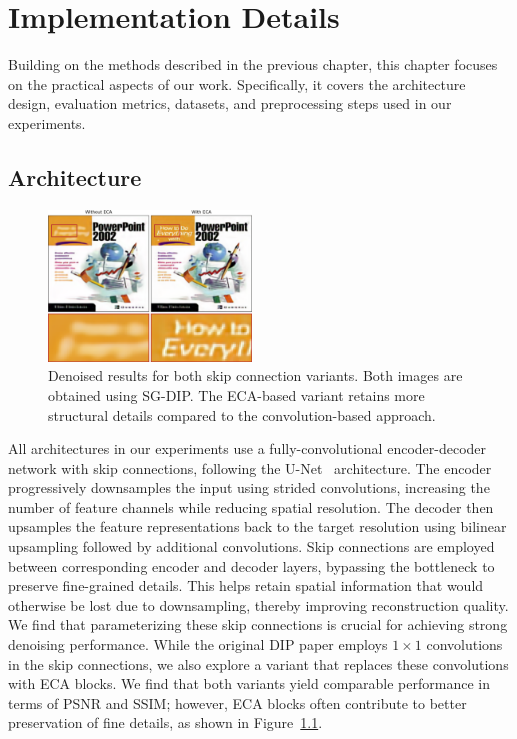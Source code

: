 \chapter{Implementation Details}

Building on the methods described in the previous chapter, this chapter focuses on the practical aspects of our work.
Specifically, it covers the architecture design, evaluation metrics, datasets, and preprocessing steps used in our experiments.

\section{Architecture}\label{sec:architecture}

\begin{figure}
    \vspace{-12pt}
    \centering
    \includegraphics[width=0.48\textwidth]{img/fig_5.1.png}
    \caption{
        Denoised results for both skip connection variants.
        Both images are obtained using SG-DIP\@.
        The ECA-based variant retains more structural details compared to the convolution-based approach.
    }\label{fig:ECA}
\end{figure}
All architectures in our experiments use a fully-convolutional encoder-decoder network with skip connections, following the U-Net~\cite{U-Net} architecture.
The encoder progressively downsamples the input using strided convolutions, increasing the number of feature channels while reducing spatial resolution.
The decoder then upsamples the feature representations back to the target resolution using bilinear upsampling followed by additional convolutions.
Skip connections are employed between corresponding encoder and decoder layers, bypassing the bottleneck to preserve fine-grained details.
This helps retain spatial information that would otherwise be lost due to downsampling, thereby improving reconstruction quality.
We find that parameterizing these skip connections is crucial for achieving strong denoising performance.
While the original DIP paper employs $1 \times 1$ convolutions in the skip connections, we also explore a variant that replaces these convolutions with ECA blocks.
We find that both variants yield comparable performance in terms of PSNR and SSIM\@; however, ECA blocks often contribute to better preservation of fine details, as shown in Figure~\ref{fig:ECA}.

